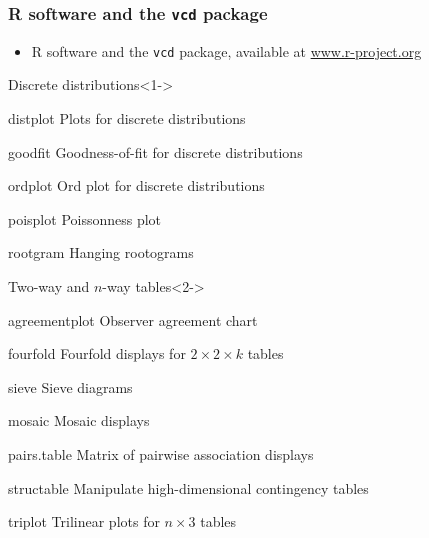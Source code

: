 \renewcommand{\FileName}{vcdpackage}

\begin{frame}
\frametitle{R software and the \texttt{vcd} package}
\begin{itemize}
\item R software and the \texttt{vcd} package, 
available at \url{www.r-project.org}
\end{itemize}

\begin{block}{Discrete distributions}<1->
\begin{proglist}
	\item[distplot] Plots for discrete distributions 
	\item[goodfit] Goodness-of-fit for discrete distributions 
	\item[ordplot] Ord plot for discrete distributions 
	\item[poisplot] Poissonness plot 
	\item[rootgram] Hanging rootograms 
\end{proglist}
\end{block}

\begin{block}{Two-way and $n$-way tables}<2->
\begin{proglist}
	\item[agreementplot] Observer agreement chart 
	\item[fourfold] Fourfold displays for $2 \times 2 \times k$ tables 
	\item[sieve] Sieve diagrams
	\item[mosaic] Mosaic displays 
	\item[pairs.table] Matrix of pairwise association displays 
	\item[structable] Manipulate high-dimensional contingency tables 
	\item[triplot] Trilinear plots for $n \times 3$ tables 
\end{proglist}
\end{block}
\end{frame}

